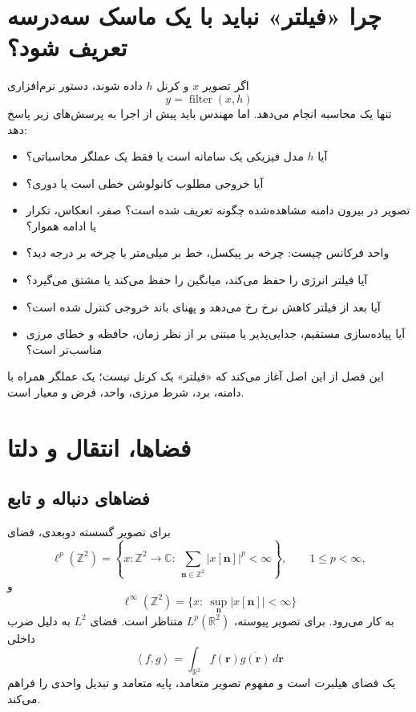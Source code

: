 \documentclass[12pt,openany,oneside]{book}
\newcommand{\R}{\mathbb{R}}
\newcommand{\C}{\mathbb{C}}
\newcommand{\Z}{\mathbb{Z}}
\newcommand{\inner}[2]{\left\langle #1,#2\right\rangle}
\newcommand{\vect}[1]{\bm{#1}}
\begin{document}
\section{چرا «فیلتر» نباید با یک ماسک سه‌درسه تعریف شود؟}

اگر تصویر \(x\) و کرنل \(h\) داده شوند، دستور نرم‌افزاری
\begin{equation}
y=\operatorname{filter}(x,h)
\end{equation}
تنها یک محاسبه انجام می‌دهد. اما مهندس باید پیش از اجرا به پرسش‌های زیر پاسخ دهد:
\begin{itemize}
\item آیا \(h\) مدل فیزیکی یک سامانه است یا فقط یک عملگر محاسباتی؟
\item آیا خروجی مطلوب کانولوشن خطی است یا دوری؟
\item تصویر در بیرون دامنه مشاهده‌شده چگونه تعریف شده است؟ صفر، انعکاس، تکرار یا ادامه هموار؟
\item واحد فرکانس چیست: چرخه بر پیکسل، خط بر میلی‌متر یا چرخه بر درجه دید؟
\item آیا فیلتر انرژی را حفظ می‌کند، میانگین را حفظ می‌کند یا مشتق می‌گیرد؟
\item آیا بعد از فیلتر کاهش نرخ رخ می‌دهد و پهنای باند خروجی کنترل شده است؟
\item آیا پیاده‌سازی مستقیم، جدایی‌پذیر یا مبتنی بر  از نظر زمان، حافظه و خطای مرزی مناسب‌تر است؟
\end{itemize}

این فصل از این اصل آغاز می‌کند که «فیلتر» یک کرنل نیست؛ یک عملگر همراه با دامنه، برد، شرط مرزی،
واحد، فرض و معیار است.

\section{فضاها، انتقال و دلتا}

\subsection{فضاهای دنباله و تابع}
برای تصویر گسسته دوبعدی، فضای
\begin{equation}
\ell^p(\Z^2)=\left\{x:\Z^2\to\C:\ \sum_{\vect n\in\Z^2}|x[\vect n]|^p<\infty\right\},
\qquad 1\le p<\infty,
\end{equation}
و
\begin{equation}
\ell^\infty(\Z^2)=\{x:\ \sup_{\vect n}|x[\vect n]|<\infty\}
\end{equation}
به کار می‌رود. برای تصویر پیوسته، \(L^p(\R^2)\) متناظر است. فضای \(L^2\) به دلیل ضرب داخلی
\begin{equation}
\inner{f}{g}=\int_{\R^2} f(\vect r)\overline{g(\vect r)}\,d\vect r
\end{equation}
یک فضای هیلبرت است و مفهوم تصویر متعامد، پایه متعامد و تبدیل واحدی را فراهم می‌کند.
\end{document}
